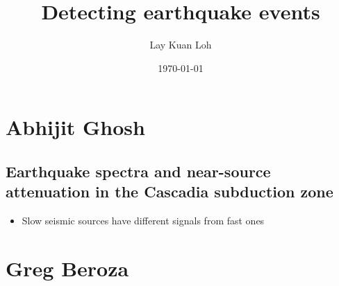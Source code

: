 \documentclass[a4paper, 11pt]{article} %
\title{Detecting earthquake events} %
\author{Lay Kuan Loh} %
\date{\today} %
\begin{document}
\maketitle %


\section{Abhijit Ghosh}

\subsection{Earthquake spectra and near-source attenuation in the Cascadia subduction zone}

\begin{itemize}
	\item Slow seismic sources have different signals from fast ones
\end{itemize}









\section{Greg Beroza}

\end{document}
